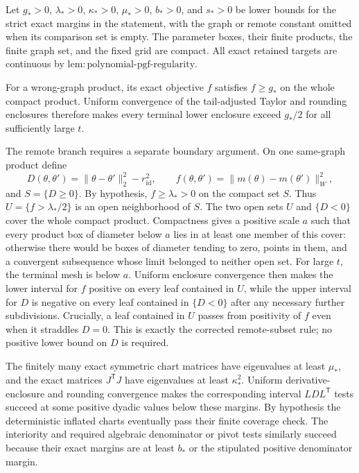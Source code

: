 Let \(g_*>0\), \(\lambda_*>0\), \(\kappa_*>0\), \(\mu_*>0\), \(b_*>0\), and \(s_*>0\) be lower bounds for the strict exact margins in the statement, with the graph or remote constant omitted when its comparison set is empty.  The parameter boxes, their finite products, the finite graph set, and the fixed grid are compact.  All exact retained targets are continuous by \(\mathrm{lem{:}polynomial\text{-}pgf\text{-}regularity}\).

For a wrong-graph product, its exact objective \(f\) satisfies \(f\geq g_*\) on the whole compact product.  Uniform convergence of the tail-adjusted Taylor and rounding enclosures therefore makes every terminal lower enclosure exceed \(g_*/2\) for all sufficiently large \(t\).

The remote branch requires a separate boundary argument.  On one same-graph product define
\[
 D(\theta,\theta')=\|\theta-\theta'\|_2^2-r_{\mathrm{id}}^2,
 \qquad
 f(\theta,\theta')=
 \|m(\theta)-m(\theta')\|_W^2,
\]
and \(S=\{D\geq0\}\).  By hypothesis, \(f\geq\lambda_*>0\) on the compact set \(S\).  Thus
\(U=\{f>\lambda_*/2\}\) is an open neighborhood of \(S\).  The two open sets \(U\) and \(\{D<0\}\) cover the whole compact product.  Compactness gives a positive scale \(a\) such that every product box of diameter below \(a\) lies in at least one member of this cover: otherwise there would be boxes of diameter tending to zero, points in them, and a convergent subsequence whose limit belonged to neither open set.  For large \(t\), the terminal mesh is below \(a\).  Uniform enclosure convergence then makes the lower interval for \(f\) positive on every leaf contained in \(U\), while the upper interval for \(D\) is negative on every leaf contained in \(\{D<0\}\) after any necessary further subdivisions.  Crucially, a leaf contained in \(U\) passes from positivity of \(f\) even when it straddles \(D=0\).  This is exactly the corrected remote-subset rule; no positive lower bound on \(D\) is required.

The finitely many exact symmetric chart matrices have eigenvalues at least \(\mu_*\), and the exact matrices \(J^{\mathsf T}J\) have eigenvalues at least \(\kappa_*^2\).  Uniform derivative-enclosure and rounding convergence makes the corresponding interval \(LDL^{\mathsf T}\) tests succeed at some positive dyadic values below these margins.  By hypothesis the deterministic inflated charts eventually pass their finite coverage check.  The interiority and required algebraic denominator or pivot tests similarly succeed because their exact margins are at least \(b_*\) or the stipulated positive denominator margin.

